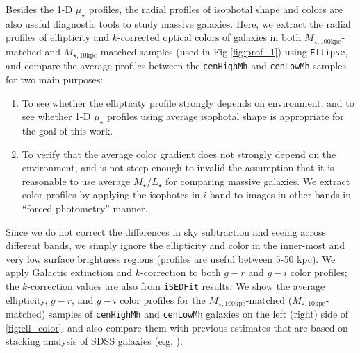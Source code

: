 \documentclass{emulateapj}
\def\rbcg{\texttt{cenHighMh}}
\def\nbcg{\texttt{cenLowMh}}
\def\minn{{$M_{\star,10\mathrm{kpc}}$}}
\def\mtot{{$M_{\star,100\mathrm{kpc}}$}}
\def\m2l{{$M_{\star}/L_{\star}$}}
\def\mden{{$\mu_{\star}$}}
\begin{document}
\begin{CJK*}{UTF8}{gbsn}
    Besides the 1-D \mden{} profiles, the radial profiles of isophotal shape and colors 
    are also useful diagnostic tools to study massive galaxies. 
    Here, we extract the radial profiles of ellipticity and $k$-corrected optical colors
    of galaxies in both \mtot{}-matched and \minn{}-matched samples (used in 
    Fig.\ref{fig:prof_1}) using \texttt{Ellipse}, and compare the average profiles between
    the \rbcg{} and \nbcg{} samples for two main purposes:
    
    \begin{enumerate}
        \item To see whether the ellipticity profile strongly depends on environment, 
            and to see whether 1-D \mden{} profiles using average isophotal shape is 
            appropriate for the goal of this work.
        
        \item To verify that the average color gradient does not strongly depend on 
            the environment, and is not steep enough to invalid the assumption that   
            it is reasonable to use average \m2l for comparing massive galaxies. 
            We extract color profiles by applying the isophotes in $i$-band to images 
            in other bands in ``forced photometry'' manner.  
    \end{enumerate}

    Since we do not correct the differences in sky subtraction and seeing across 
    different bands, we simply ignore the ellipticity and color in the inner-most and 
    very low surface brightness regions (profiles are useful between 5-50 kpc). 
    We apply Galactic extinction and $k$-correction to both $g-r$ and $g-i$ color 
    profiles; the $k$-correction values are also from \texttt{iSEDFit} results.
    We show the average ellipticity, $g-r$, and $g-i$ color profiles for the 
    \mtot{}-matched (\minn{}-matched) samples of \rbcg{} and \nbcg{} galaxies on the 
    left (right) side of \ref{fig:ell_color}, and also compare them with previous 
    estimates that are based on stacking analysis of SDSS galaxies 
    (e.g. \citealt{LaBarbera2010, Tal2011, DSouza2014}).


\end{CJK*}
\end{document}
